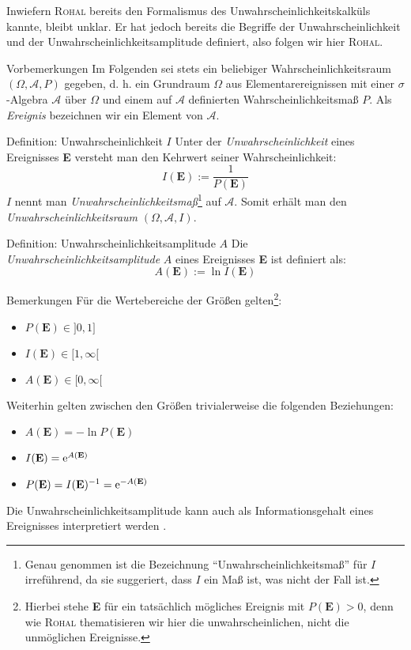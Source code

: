 Inwiefern \textsc{Rohal} bereits den Formalismus des Unwahrscheinlichkeitskalküls kannte, bleibt unklar. Er hat jedoch bereits die Begriffe der Unwahrscheinlichkeit und der Unwahrscheinlichkeitsamplitude definiert, also folgen wir hier \textsc{Rohal}.
\begin{bla}{Vorbemerkungen}
Im Folgenden sei stets ein beliebiger Wahrscheinlichkeitsraum $(\Omega,\mathcal{A},P)$ gegeben, d. h. ein Grundraum $\Omega$ aus Elementarereignissen mit einer $\sigma$-Algebra $\mathcal{A}$ über $\Omega$ und einem auf $\mathcal{A}$ definierten Wahrscheinlichkeitsmaß $P$. Als \emph{Ereignis} bezeichnen wir ein Element von $\mathcal{A}$.
\end{bla}
\begin{bla}{Definition: Unwahrscheinlichkeit $I$}
Unter der \emph{Unwahrscheinlichkeit} eines Ereignisses \textbf{E} versteht man den Kehrwert seiner Wahrscheinlichkeit:\\
\begin{equation}
I(\textbf{E}) := \frac{1}{P(\textbf{E})}
\end{equation}
$I$ nennt man \emph{Unwahrscheinlichkeitsmaß}\footnote{Genau genommen ist die Bezeichnung "`Unwahrscheinlichkeitsmaß"' für $I$ irreführend, da sie suggeriert, dass $I$ ein Maß ist, was nicht der Fall ist.} auf $\mathcal{A}$. Somit erhält man den \emph{Unwahrscheinlichkeitsraum} $(\Omega,\mathcal{A},I)$.
\end{bla}
\clearpage
\begin{bla}{Definition: Unwahrscheinlichkeitsamplitude $A$}
Die \emph{Unwahrscheinlichkeitsamplitude} $A$ eines Ereignisses \textbf{E} ist definiert als:
\begin{equation}
A(\textbf{E}) := \ln{I(\textbf{E})}
\end{equation}
\end{bla}
\begin{bla}{Bemerkungen}
Für die Wertebereiche der Größen gelten\footnote{Hierbei stehe \textbf{E} für ein tatsächlich mögliches Ereignis mit $P(\textbf{E}) > 0$, denn wie \textsc{Rohal} thematisieren wir hier die unwahrscheinlichen, nicht die unmöglichen Ereignisse.}:
\begin{itemize}
\item $P(\textbf{E}) \in ]0,1]$
\item $I(\textbf{E}) \in [1,\infty[$
\item $A(\textbf{E}) \in [0,\infty[$
\end{itemize}
Weiterhin gelten zwischen den Größen trivialerweise die folgenden Beziehungen:
\begin{itemize}
\item $A(\textbf{E}) = - \ln P(\textbf{E})$
\item $I(\textbf{E}) = \text{\rmfamily e} ^ {A(\textbf{E})}$
\item $P(\textbf{E}) = I(\textbf{E}) ^{-1} = \text{\rmfamily e} ^{-A(\textbf{E})}$
\end{itemize}
Die Unwahrscheinlichkeitsamplitude kann auch als Informationsgehalt eines Ereignisses interpretiert werden \cite{informationstheorie}.
\end{bla}
